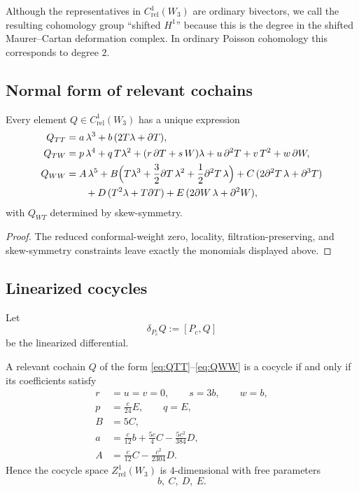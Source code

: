 \begin{remark}
Although the representatives in $C^1_{\mathrm{rel}}(W_3)$ are ordinary bivectors, we call
the resulting cohomology group ``shifted $H^1$'' because this is the degree in the shifted
Maurer--Cartan deformation complex. In ordinary Poisson cohomology this corresponds to
degree $2$.
\end{remark}

\subsection{Normal form of relevant cochains}

\begin{proposition}\label{prop:W3normalform}
Every element $Q\in C^1_{\mathrm{rel}}(W_3)$ has a unique expression
\begin{align}
Q_{TT}&=a\,\lambda^3+b\,(2T\lambda+\partial T),\label{eq:QTT}\\
Q_{TW}&=p\,\lambda^4+q\,T\lambda^2+(r\,\partial T+s\,W)\lambda+u\,\partial^2T+v\,T^2+w\,\partial W,\label{eq:QTW}\\
Q_{WW}&=
A\,\lambda^5
+B\Big(T\lambda^3+\frac32\partial T\,\lambda^2+\frac12\partial^2T\,\lambda\Big)
+C\,(2\partial^2T\,\lambda+\partial^3T)\notag\\
&\qquad
+D\,(T^2\lambda+T\partial T)
+E\,(2\partial W\,\lambda+\partial^2W),\label{eq:QWW}
\end{align}
with $Q_{WT}$ determined by skew-symmetry.
\end{proposition}

\begin{proof}
The reduced conformal-weight zero, locality, filtration-preserving, and skew-symmetry
constraints leave exactly the monomials displayed above.
\end{proof}

\subsection{Linearized cocycles}

Let
\[
\delta_{P_c}Q:=[P_c,Q]
\]
be the linearized differential.

\begin{proposition}\label{prop:W3cocycles}
A relevant cochain $Q$ of the form \eqref{eq:QTT}--\eqref{eq:QWW} is a cocycle if and only if
its coefficients satisfy
\begin{align}
r&=u=v=0,\qquad s=3b,\qquad w=b,\label{eq:rel1}\\
p&=\frac c{24}E,\qquad q=E,\label{eq:rel2}\\
B&=5C,\label{eq:rel3}\\
a&=\frac c{12}b+\frac{5c}{4}C-\frac{5c^2}{384}D,\label{eq:rel4}\\
A&=\frac c{12}C-\frac{c^2}{2304}D.\label{eq:rel5}
\end{align}
Hence the cocycle space $Z^1_{\mathrm{rel}}(W_3)$ is $4$-dimensional with free parameters
\[
b,\ C,\ D,\ E.
\]
\end{proposition}

